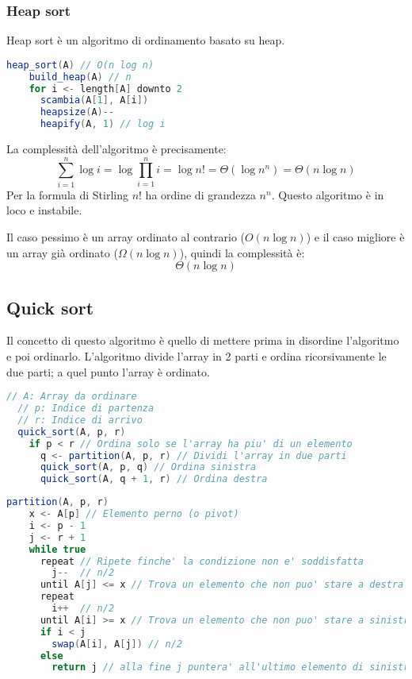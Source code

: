 \documentclass[a4paper]{article}
\begin{document}
\subsubsection{Heap sort}
Heap sort è un algoritmo di ordinamento basato su heap.
\begin{lstlisting}[language=Scala]
  heap_sort(A) // O(n log n)
    build_heap(A) // n
    for i <- length[A] downto 2
      scambia(A[1], A[i])
      heapsize(A)--
      heapify(A, 1) // log i
\end{lstlisting}


La complessità dell'algoritmo è precisamente:
\[
\sum_{i=1}^{n} \log i = \log \prod_{i=1}^{n} i = \log n! = \Theta(\log n^n) = \Theta(n \log n)
\] 
Per la formula di Stirling \( n! \) ha ordine di grandezza \( n^n \). Questo algoritmo
è in loco e instabile.

\vspace{1em}
\noindent
Il caso pessimo è un array ordinato al contrario (\( O(n \log n)\)) e il caso migliore
è un array già ordinato (\( \Omega(n \log n)\)), quindi la complessità è:
\[
\Theta(n \log n)
\]

\subsection{Quick sort}
Il concetto di questo algoritmo è quello di mettere prima in disordine l'algoritmo e poi
ordinarlo. L'algoritmo divide l'array in 2 parti e ordina ricorsivamente le due parti; a
quel punto l'array è ordinato.

\begin{lstlisting}[language=Scala]
  // A: Array da ordinare 
  // p: Indice di partenza
  // r: Indice di arrivo
  quick_sort(A, p, r)
    if p < r // Ordina solo se l'array ha piu' di un elemento
      q <- partition(A, p, r) // Dividi l'array in due parti
      quick_sort(A, p, q) // Ordina sinistra
      quick_sort(A, q + 1, r) // Ordina destra
\end{lstlisting}
\begin{lstlisting}[language=Scala]
  partition(A, p, r)
    x <- A[p] // Elemento perno (o pivot)
    i <- p - 1
    j <- r + 1
    while true
      repeat // Ripete finche' la condizione non e' soddisfatta
        j--  // n/2
      until A[j] <= x // Trova un elemento che non puo' stare a destra
      repeat
        i++  // n/2
      until A[i] >= x // Trova un elemento che non puo' stare a sinistra
      if i < j
        swap(A[i], A[j]) // n/2
      else
        return j // alla fine j puntera' all'ultimo elemento di sinistra
\end{lstlisting}
\end{document}
